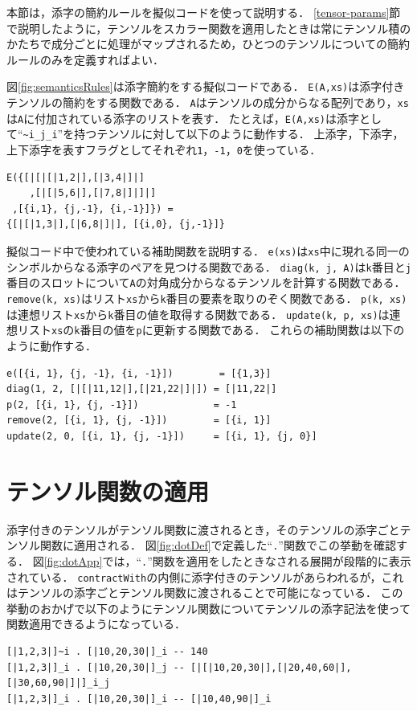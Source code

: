 本節は，添字の簡約ルールを擬似コードを使って説明する．
\ref{tensor-params}節で説明したように，テンソルをスカラー関数を適用したときは常にテンソル積のかたちで成分ごとに処理がマップされるため，ひとつのテンソルについての簡約ルールのみを定義すればよい．

図\ref{fig:semanticsRules}は添字簡約をする擬似コードである．
\lstinline{E(A,xs)}は添字付きテンソルの簡約をする関数である．
\lstinline{A}はテンソルの成分からなる配列であり，\lstinline{xs}は\lstinline{A}に付加されている添字のリストを表す．
たとえば，\lstinline{E(A,xs)}は添字として``\lstinline|~i_j_i|''を持つテンソルに対して以下のように動作する．
上添字，下添字，上下添字を表すフラグとしてそれぞれ\lstinline{1}，\lstinline{-1}，\lstinline{0}を使っている．
\begin{lstlisting}[language=egison,numbers=none]
E({[|[|[|1,2|],[|3,4|]|]
    ,[|[|5,6|],[|7,8|]|]|]
 ,[{i,1}, {j,-1}, {i,-1}]}) =
{[|[|1,3|],[|6,8|]|], [{i,0}, {j,-1}]}
\end{lstlisting}
擬似コード中で使われている補助関数を説明する．
\lstinline{e(xs)}は\lstinline{xs}中に現れる同一のシンボルからなる添字のペアを見つける関数である．
\lstinline{diag(k, j, A)}は\lstinline{k}番目と\lstinline{j}番目のスロットについて\lstinline{A}の対角成分からなるテンソルを計算する関数である．
\lstinline{remove(k, xs)}はリスト\lstinline{xs}から\lstinline{k}番目の要素を取りのぞく関数である．
\lstinline{p(k, xs)}は連想リスト\lstinline{xs}から\lstinline{k}番目の値を取得する関数である．
\lstinline{update(k, p, xs)}は連想リスト\lstinline{xs}の\lstinline{k}番目の値を\lstinline{p}に更新する関数である．
これらの補助関数は以下のように動作する．
\begin{lstlisting}[language=egison,numbers=none]
e([{i, 1}, {j, -1}, {i, -1}])        = [{1,3}]
diag(1, 2, [|[|11,12|],[|21,22|]|]) = [|11,22|]
p(2, [{i, 1}, {j, -1}])             = -1
remove(2, [{i, 1}, {j, -1}])        = [{i, 1}]
update(2, 0, [{i, 1}, {j, -1}])     = [{i, 1}, {j, 0}]
\end{lstlisting}

\section{テンソル関数の適用}\label{tensor-tensorfunc}

添字付きのテンソルがテンソル関数に渡されるとき，そのテンソルの添字ごとテンソル関数に適用される．
図\ref{fig:dotDef}で定義した``\lstinline{.}''関数でこの挙動を確認する．
図\ref{fig:dotApp}では，``\lstinline{.}''関数を適用をしたときなされる展開が段階的に表示されている．
\lstinline{contractWith}の内側に添字付きのテンソルがあらわれるが，これはテンソルの添字ごとテンソル関数に渡されることで可能になっている．
この挙動のおかげで以下のようにテンソル関数についてテンソルの添字記法を使って関数適用できるようになっている．
\begin{lstlisting}[language=egison,numbers=none]
[|1,2,3|]~i . [|10,20,30|]_i -- 140
[|1,2,3|]_i . [|10,20,30|]_j -- [|[|10,20,30|],[|20,40,60|],[|30,60,90|]|]_i_j
[|1,2,3|]_i . [|10,20,30|]_i -- [|10,40,90|]_i
\end{lstlisting}

